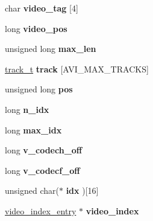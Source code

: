 \begin{DoxyCompactItemize}
\item 
\hypertarget{structavi__t_af1db102b0a1b4c51656fb22bd988dfac}{char {\bfseries video\+\_\+tag} \mbox{[}4\mbox{]}}\label{structavi__t_af1db102b0a1b4c51656fb22bd988dfac}

\item 
\hypertarget{structavi__t_a24510eed18da1e61d8ff0b9ec91acade}{long {\bfseries video\+\_\+pos}}\label{structavi__t_a24510eed18da1e61d8ff0b9ec91acade}

\item 
\hypertarget{structavi__t_af755d150710b85bca0bb7c1db1cf44dd}{unsigned long {\bfseries max\+\_\+len}}\label{structavi__t_af755d150710b85bca0bb7c1db1cf44dd}

\item 
\hypertarget{structavi__t_a68b323d6eb56bd1ecca66d5e5889ebcc}{\hyperlink{structtrack__s}{track\+\_\+t} {\bfseries track} \mbox{[}A\+V\+I\+\_\+\+M\+A\+X\+\_\+\+T\+R\+A\+C\+K\+S\mbox{]}}\label{structavi__t_a68b323d6eb56bd1ecca66d5e5889ebcc}

\item 
\hypertarget{structavi__t_a4c36492540b9218b56f9f8c3dfb1b638}{unsigned long {\bfseries pos}}\label{structavi__t_a4c36492540b9218b56f9f8c3dfb1b638}

\item 
\hypertarget{structavi__t_ac5324712c1a53b19b8bfe635a52e1a8a}{long {\bfseries n\+\_\+idx}}\label{structavi__t_ac5324712c1a53b19b8bfe635a52e1a8a}

\item 
\hypertarget{structavi__t_a8a13bf0efeb472d41e2eb53d4cc34438}{long {\bfseries max\+\_\+idx}}\label{structavi__t_a8a13bf0efeb472d41e2eb53d4cc34438}

\item 
\hypertarget{structavi__t_a9bb9e3014a09878ea9ebcde23da3d250}{long {\bfseries v\+\_\+codech\+\_\+off}}\label{structavi__t_a9bb9e3014a09878ea9ebcde23da3d250}

\item 
\hypertarget{structavi__t_a759f1524cd3366eb6ef425c3b75e75ff}{long {\bfseries v\+\_\+codecf\+\_\+off}}\label{structavi__t_a759f1524cd3366eb6ef425c3b75e75ff}

\item 
\hypertarget{structavi__t_aa31298efecb7b06c2afee1179106787d}{unsigned char($\ast$ {\bfseries idx} )\mbox{[}16\mbox{]}}\label{structavi__t_aa31298efecb7b06c2afee1179106787d}

\item 
\hypertarget{structavi__t_a3dc2f200ff882457adace02517f786c3}{\hyperlink{structvideo__index__entry}{video\+\_\+index\+\_\+entry} $\ast$ {\bfseries video\+\_\+index}}\label{structavi__t_a3dc2f200ff882457adace02517f786c3}


\end{DoxyCompactItemize}
